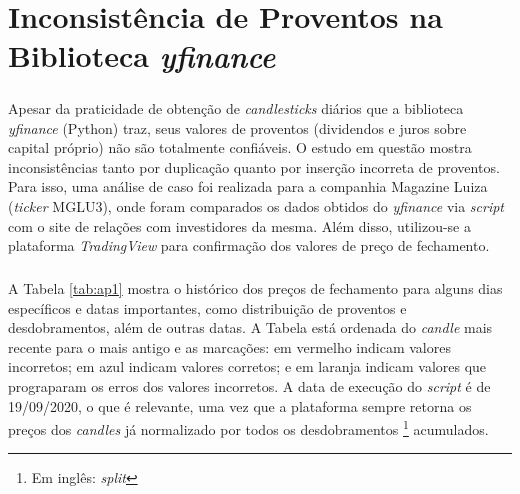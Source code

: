 \chapter{Inconsistência de Proventos na Biblioteca \textit{yfinance}}
\label{ApendiceA}

\paragraph{} Apesar da praticidade de obtenção de \textit{candlesticks} diários que a biblioteca \textit{yfinance} (Python) traz, seus valores de proventos (dividendos e juros sobre capital próprio) não são totalmente confiáveis. O estudo em questão mostra inconsistências tanto por duplicação quanto por inserção incorreta de proventos. Para isso, uma análise de caso foi realizada para a companhia Magazine Luiza (\textit{ticker} MGLU3), onde foram comparados os dados obtidos do \textit{yfinance} via \textit{script} com o site de relações com investidores \cite{mglu_ri} da mesma. Além disso, utilizou-se a plataforma \textit{TradingView} \cite{tradingview} para confirmação dos valores de preço de fechamento.


\paragraph{} A Tabela \ref{tab:ap1} mostra o histórico dos preços de fechamento para alguns dias específicos e datas importantes, como distribuição de proventos e desdobramentos, além de outras datas. A Tabela está ordenada do \textit{candle} mais recente para o mais antigo e as marcações: em vermelho indicam valores incorretos; em azul indicam valores corretos; e em laranja indicam valores que prograparam os erros dos valores incorretos. A data de execução do \textit{script} é de 19/09/2020, o que é relevante, uma vez que a plataforma sempre retorna os preços dos \textit{candles} já normalizado por todos os desdobramentos \footnote{Em inglês: \textit{split}} acumulados.


